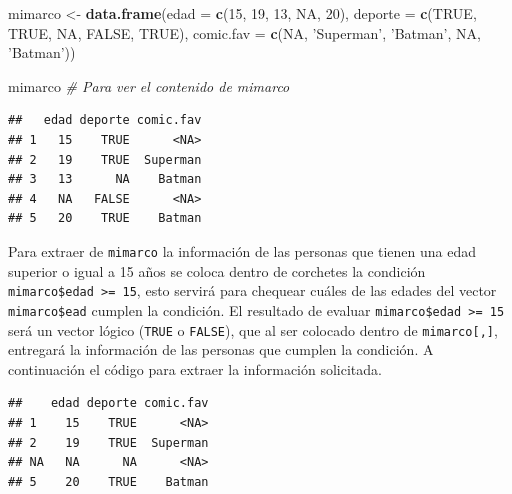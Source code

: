 \documentclass[10pt,]{krantz}
\makeatletter
\newenvironment{Shaded}{\begin{snugshade}}{\end{snugshade}}
\newcommand{\KeywordTok}[1]{\textcolor[rgb]{0.13,0.29,0.53}{\textbf{{#1}}}}
\newcommand{\DataTypeTok}[1]{\textcolor[rgb]{0.13,0.29,0.53}{{#1}}}
\newcommand{\DecValTok}[1]{\textcolor[rgb]{0.00,0.00,0.81}{{#1}}}
\newcommand{\StringTok}[1]{\textcolor[rgb]{0.31,0.60,0.02}{{#1}}}
\newcommand{\CommentTok}[1]{\textcolor[rgb]{0.56,0.35,0.01}{\textit{{#1}}}}
\newcommand{\OtherTok}[1]{\textcolor[rgb]{0.56,0.35,0.01}{{#1}}}
\newcommand{\NormalTok}[1]{{#1}}
\newenvironment{kframe}{%
\medskip{}
\setlength{\fboxsep}{.8em}
 \def\at@end@of@kframe{}%
 \ifinner\ifhmode%
  \def\at@end@of@kframe{\end{minipage}}%
  \begin{minipage}{\columnwidth}%
 \fi\fi%
 \def\FrameCommand##1{\hskip\@totalleftmargin \hskip-\fboxsep
 \colorbox{shadecolor}{##1}\hskip-\fboxsep
     \hskip-\linewidth \hskip-\@totalleftmargin \hskip\columnwidth}%
 \MakeFramed {\advance\hsize-\width
   \@totalleftmargin\z@ \linewidth\hsize
   \@setminipage}}%
 {\par\unskip\endMakeFramed%
 \at@end@of@kframe}
\renewenvironment{Shaded}{\begin{kframe}}{\end{kframe}}
\makeatother
\begin{document}
\begin{Shaded}
\begin{Highlighting}[]
\NormalTok{mimarco <-}\StringTok{ }\KeywordTok{data.frame}\NormalTok{(}\DataTypeTok{edad =} \KeywordTok{c}\NormalTok{(}\DecValTok{15}\NormalTok{, }\DecValTok{19}\NormalTok{, }\DecValTok{13}\NormalTok{, }\OtherTok{NA}\NormalTok{, }\DecValTok{20}\NormalTok{), }
                      \DataTypeTok{deporte =} \KeywordTok{c}\NormalTok{(}\OtherTok{TRUE}\NormalTok{, }\OtherTok{TRUE}\NormalTok{, }\OtherTok{NA}\NormalTok{, }\OtherTok{FALSE}\NormalTok{, }\OtherTok{TRUE}\NormalTok{),}
                      \DataTypeTok{comic.fav =} \KeywordTok{c}\NormalTok{(}\OtherTok{NA}\NormalTok{, }\StringTok{'Superman'}\NormalTok{, }\StringTok{'Batman'}\NormalTok{,}
                                    \OtherTok{NA}\NormalTok{, }\StringTok{'Batman'}\NormalTok{))}

\NormalTok{mimarco  }\CommentTok{# Para ver el contenido de mimarco}
\end{Highlighting}
\end{Shaded}

\begin{verbatim}
##   edad deporte comic.fav
## 1   15    TRUE      <NA>
## 2   19    TRUE  Superman
## 3   13      NA    Batman
## 4   NA   FALSE      <NA>
## 5   20    TRUE    Batman
\end{verbatim}

Para extraer de \texttt{mimarco} la información de las personas que
tienen una edad superior o igual a 15 años se coloca dentro de corchetes
la condición \texttt{mimarco\$edad\ \textgreater{}=\ 15}, esto servirá
para chequear cuáles de las edades del vector \texttt{mimarco\$ead}
cumplen la condición. El resultado de evaluar
\texttt{mimarco\$edad\ \textgreater{}=\ 15} será un vector lógico
(\texttt{TRUE} o \texttt{FALSE}), que al ser colocado dentro de
\texttt{mimarco{[},{]}}, entregará la información de las personas que
cumplen la condición. A continuación el código para extraer la
información solicitada.

\begin{Shaded}
\end{Shaded}

\begin{verbatim}
##    edad deporte comic.fav
## 1    15    TRUE      <NA>
## 2    19    TRUE  Superman
## NA   NA      NA      <NA>
## 5    20    TRUE    Batman
\end{verbatim}
\end{document}

